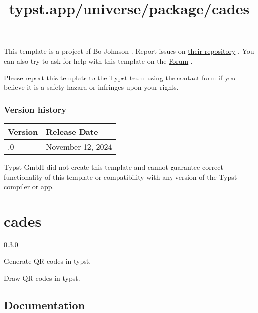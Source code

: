 This template is a project of Bo Johnson . Report issues on
\href{https://github.com/bojohnson5/modern-iu-thesis}{their repository}
. You can also try to ask for help with this template on the
\href{https://forum.typst.app}{Forum} .

Please report this template to the Typst team using the
\href{https://typst.app/contact}{contact form} if you believe it is a
safety hazard or infringes upon your rights.

\label{versions}
\subsubsection{Version history}\label{version-history}

\begin{longtable}[]{@{}ll@{}}
\toprule\noalign{}
Version & Release Date \\
\midrule\noalign{}
\endhead
\bottomrule\noalign{}
\endlastfoot
0.1.0 & November 12, 2024 \\
\end{longtable}

Typst GmbH did not create this template and cannot guarantee correct
functionality of this template or compatibility with any version of the
Typst compiler or app.


\title{typst.app/universe/package/cades}

\label{banner}
\section{cades}\label{cades}

{ 0.3.0 }

Generate QR codes in typst.

\label{readme}
Draw QR codes in typst.

\begin{Shaded}
\begin{Highlighting}[]

\end{Highlighting}
\end{Shaded}

\subsection{Documentation}\label{documentation}

